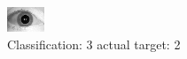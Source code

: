 \begin{figure}[h!]
\begin{center}
\includegraphics[width=0.60\columnwidth]{figures/ID1670_class_3_target_2.png}
\end{center}
\caption{ Classification: 3 actual target: 2}
\label{fig:ID1670_class_3_target_2}
\end{figure}
